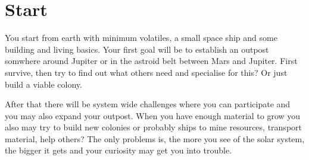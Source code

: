 \section{Start}

You start from earth with minimum volatiles, a small space ship and some building and living basics. Your first goal will be to establish an outpost somwhere around Jupiter or in the astroid belt between Mars and Jupiter. First survive, then try to find out what others need and specialise for this? Or just build a viable colony.

After that there will be system wide challenges where you can participate and you may also expand your outpost. When you have enough material to grow you also may try to build new colonies or probably ships to mine resources, transport material, help others? The only problems is, the more you see of the solar system, the bigger it gets and your curiosity may get you into trouble.

